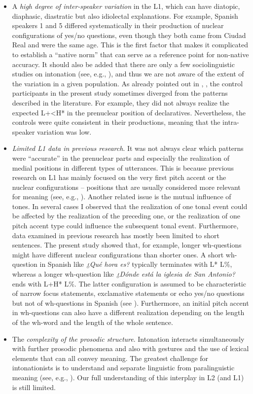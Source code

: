 \begin{itemize}
\item A \textit{high degree of inter-speaker variation} in the L1, which can have diatopic, diaphasic, diastratic but also idiolectal explanations. For example, Spanish speakers 1 and 5 differed systematically in their production of nuclear configurations of yes/no questions, even though they both came from Ciudad Real and were the same age. This is the first factor that makes it complicated to establish a “native norm” that can serve as a reference point for non-native accuracy. It should also be added that there are only a few sociolinguistic studies on intonation (see, e.g., \citealt{EnbeTobin2008}), and thus we are not aware of the extent of the variation in a given population. As already pointed out in , \textit{}, the control participants in the present study sometimes diverged from the patterns described in the literature. For example, they did not always realize the expected L+<H* in the prenuclear position of declaratives. Nevertheless, the controls were quite consistent in their productions, meaning that the intra-speaker variation was low.

\item \textit{Limited L1 data in previous research}. It was not always clear which patterns were “accurate” in the prenuclear parts and especially the realization of medial positions in different types of utterances. This is because previous research on L1 has mainly focused on the very first pitch accent or the nuclear configurations -- positions that are usually considered more relevant for meaning (see, e.g., \citealt{Ladd2008}). Another related issue is the mutual influence of tones. In several cases I observed that the realization of one tonal event could be affected by the realization of the preceding one, or the realization of one pitch accent type could influence the subsequent tonal event. Furthermore, data examined in previous research has mostly been limited to short sentences. The present study showed that, for example, longer wh-questions might have different nuclear configurations than shorter ones. A short wh-question in Spanish like \textit{¿Qué hora es?} typically terminates with L* L\%, whereas a longer wh-question like \textit{¿Dónde está la iglesia de San Antonio?} ends with L+H* L\%. The latter configuration is assumed to be characteristic of narrow focus statements, exclamative statements or echo yes/no questions but not of wh-questions in Spanish (see \citealt{Estebas-VilaplanaPrieto2010}). Furthermore, an initial pitch accent in wh-questions can also have a different realization depending on the length of the wh-word and the length of the whole sentence.

\item The \textit{complexity of the prosodic structure}. Intonation interacts simultaneously with further prosodic phenomena and also with gestures and the use of lexical elements that can all convey meaning. The greatest challenge for intonationists is to understand and separate linguistic from paralinguistic meaning (see, e.g., \citealt{Ladd2008, Arvaniti2022}). Our full understanding of this interplay in L2 (and L1) is still limited.
\end{itemize}

